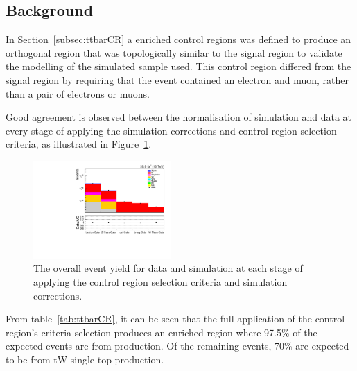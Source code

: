 \subsection{\ttbar Background}\label{subsec:ttbarEstimation}
In Section~\ref{subsec:ttbarCR} a \ttbar enriched control regions was defined to produce an orthogonal region that was topologically similar to the signal region to validate the modelling of the simulated \ttbar sample used.
This control region differed from the signal region by requiring that the event contained an electron and muon, rather than a pair of electrons or muons.

Good agreement is observed between the normalisation of simulation and data at every stage of applying the simulation corrections and control region selection criteria, as illustrated in Figure~\ref{fig:ttbar_cutFlow}.

\begin{figure}[tbp]
\centering
\includegraphics[width=0.47\textwidth]{figs/background-estimation/plots/unblinded/ttbar_control/cutFlow_log.pdf}
\caption{
The overall event yield for data and simulation at each stage of applying the \ttbar control region selection criteria and simulation corrections.
}
\label{fig:ttbar_cutFlow}
\end{figure}

From table~\ref{tab:ttbarCR}, it can be seen that the full application of the control region's criteria selection produces an enriched region where 97.5\% of the expected events are from \ttbar production.
Of the remaining events, 70\% are expected to be from tW single top production.

